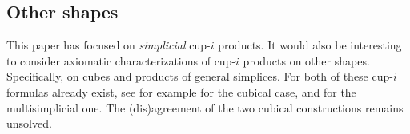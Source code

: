 \subsection{Other shapes}

This paper has focused on \textit{simplicial} cup-$i$ products.
It would also be interesting to consider axiomatic characterizations of cup-$i$ products on other shapes.
Specifically, on cubes and products of general simplices.
For both of these cup-$i$ formulas already exist, see for example \cite{pilarczyk2016cubical,medina2022cube_einfty} for the cubical case, and \cite{medina2024multisimplicial} for the multisimplicial one.
The (dis)agreement of the two cubical constructions remains unsolved.


